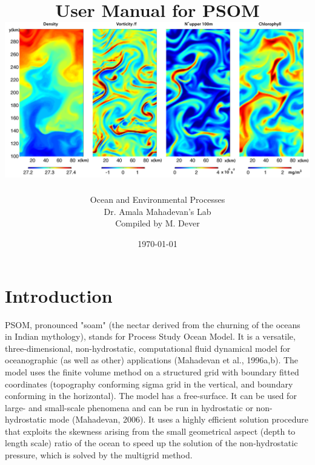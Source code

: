 \documentclass[12pt,letterpaper,titlepage]{article}
\begin{document}
	
	
	
	\title{User Manual for PSOM\\[.5cm] \includegraphics[width =\linewidth]{PSOM_cover_photo}}
	\author{Ocean and Environmental Processes\\ Dr. Amala Mahadevan's Lab\\ {\small Compiled by M. Dever}}
	\date{\today}
	\maketitle

\tableofcontents
\pagebreak

\section{Introduction}




PSOM, pronounced "soam" (the nectar derived from the churning of the oceans in Indian mythology), stands for Process Study Ocean Model. 
It is a versatile, three-dimensional, non-hydrostatic, computational fluid dynamical model for oceanographic (as well as other) applications (Mahadevan et al., 1996a,b). 
The model uses the finite volume method on a structured grid with boundary fitted coordinates (topography conforming sigma grid in the vertical, and boundary conforming in the horizontal). 
The model has a free-surface. It can be used for large- and small-scale phenomena and can be run in hydrostatic or non-hydrostatic mode (Mahadevan, 2006). It uses a highly efficient solution procedure that exploits the skewness arising from the small geometrical aspect (depth to length scale) ratio of the ocean to speed up the solution of the non-hydrostatic pressure, which is solved by the multigrid method. 
\end{document}
